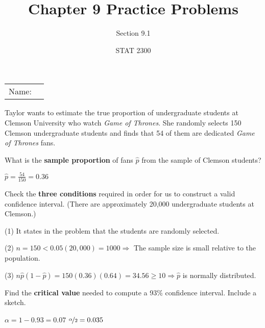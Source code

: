 \documentclass[noanswers]{exam}
\title{Chapter 9 Practice Problems}
\author{Section 9.1}
\date{STAT 2300}
\begin{document}
\noindent\begin{tabular}{@{}p{.3in}p{3in}@{}}
Name: & \hrulefill
\end{tabular}

\vspace{4mm}

\noindent Taylor wants to estimate the true proportion of undergraduate students at Clemson University who watch \textit{Game of Thrones}. She randomly selects 150 Clemson undergraduate students and finds that 54 of them are dedicated \textit{Game of Thrones} fans.
\begin{questions} 

\question What is the \textbf{sample proportion} of fans $\hat{p}$ from the sample of Clemson students?

\begin{solution}[\stretch{1}]
\vspace{1mm}

$\hat{p}=\frac{54}{150}=0.36$

\vspace{1mm}
\end{solution}

\question Check the \textbf{three conditions} required in order for us to construct a valid confidence interval. (There are approximately 20,000 undergraduate students at Clemson.)

\begin{solution}[\stretch{1}]

\vspace{1mm}

(1) It states in the problem that the students are randomly selected.

\vspace{2mm}

(2) $n=150<0.05(20,000)=1000 \Rightarrow$ The sample size is small relative to the population.

\vspace{2mm}

(3) $n\hat{p}(1-\hat{p})=150(0.36)(0.64)=34.56\geq 10 \Rightarrow \hat{p}$ is normally distributed.

\vspace{1mm}
\end{solution}

\question Find the \textbf{critical value} needed to compute a 93\% confidence interval. Include a sketch.

\begin{solution}[\stretch{1}]
\vspace{1mm}
$\alpha=1-0.93=0.07$ \hspace{10mm} $\nicefrac{\alpha}{2}=0.035$


\end{solution}
\end{questions}
\end{document}
